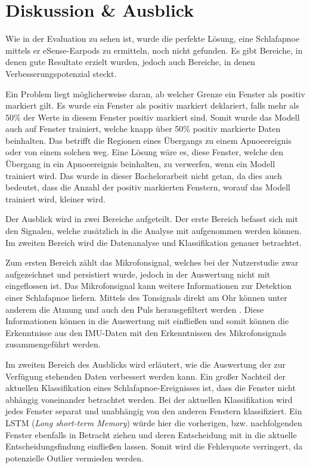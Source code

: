 
\chapter{Diskussion \& Ausblick}
\label{ch:FutureWork}
%

Wie in der Evaluation zu sehen ist, wurde die perfekte Lösung, eine Schlafapnoe mittels er eSense-Earpods zu ermitteln, noch nicht gefunden.
Es gibt Bereiche, in denen gute Resultate erzielt wurden, jedoch auch Bereiche, in denen Verbesserungspotenzial steckt. 

Ein Problem liegt möglicherweise daran, ab welcher Grenze ein Fenster als positiv markiert gilt.
Es wurde ein Fenster als positiv markiert deklariert, falls mehr als 50\% der Werte in diesem Fenster positiv markiert sind.
Somit wurde das Modell auch auf Fenster trainiert, welche knapp über 50\% positiv markierte Daten beinhalten.
Das betrifft die Regionen eines Übergangs zu einem Apnoeereignis oder von einem solchen weg.
Eine Lösung wäre es, diese Fenster, welche den Übergang in ein Apnoeereignis beinhalten, zu verwerfen, wenn ein Modell trainiert wird. 
Das wurde in dieser Bachelorarbeit nicht getan, da dies auch bedeutet, dass die Anzahl der positiv markierten Fenstern, worauf das Modell trainiert wird, kleiner wird.

Der Ausblick wird in zwei Bereiche aufgeteilt.
Der erste Bereich befasst sich mit den Signalen, welche zusätzlich in die Analyse mit aufgenommen werden können.
Im zweiten Bereich wird die Datenanalyse und Klassifikation genauer betrachtet.

Zum ersten Bereich zählt das Mikrofonsignal, welches bei der Nutzerstudie zwar aufgezeichnet und persistiert wurde, jedoch in der Auswertung nicht mit eingeflossen ist. 
Das Mikrofonsignal kann weitere Informationen zur Detektion einer Schlafapnoe liefern. 
Mittels des Tonsignals direkt am Ohr können unter anderem die Atmung und auch den Puls herausgefiltert werden \cite{nomaWearableDataAcquisition2005}.
Diese Informationen können in die Auswertung mit einfließen und somit können die Erkenntnisse aus den IMU-Daten mit den Erkenntnissen des Mikrofonsignals zusammengeführt werden.

Im zweiten Bereich des Ausblicks wird erläutert, wie die Auswertung der zur Verfügung stehenden Daten verbessert werden kann.
Ein großer Nachteil der aktuellen Klassifikation eines Schlafapnoe-Ereignisses ist, dass die Fenster nicht abhängig voneinander betrachtet werden.
Bei der aktuellen Klassifikation wird jedes Fenster separat und unabhängig von den anderen Fenstern klassifiziert.
Ein LSTM (\textit{Long short-term Memory}) würde hier die vorherigen, bzw. nachfolgenden Fenster ebenfalls in Betracht ziehen und deren Entscheidung mit in die aktuelle Entscheidungsfindung einfließen lassen. 
Somit wird die Fehlerquote verringert, da potenzielle Outlier vermieden werden.

